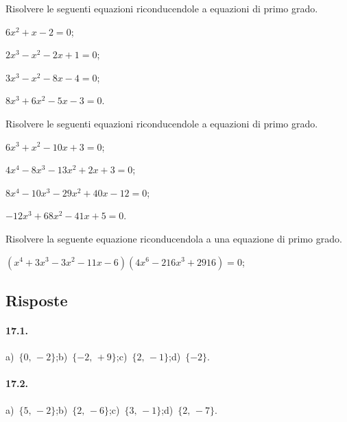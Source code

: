 \begin{esercizio}[\Ast]
\label{ese:17.12}
Risolvere le seguenti equazioni riconducendole a equazioni di primo grado.
\begin{multicols}{2}
\begin{enumeratea}
 \item $6x^{2}+x-2=0$;
 \item $2x^{3}-x^{2}-2x+1=0$;
 \item $3x^{3}-x^{2}-8x-4=0$;
 \item $8x^{3}+6x^{2}-5x-3=0$.
\end{enumeratea}
\end{multicols}
\end{esercizio}

\begin{esercizio}[\Ast]
\label{ese:17.13}
Risolvere le seguenti equazioni riconducendole a equazioni di primo grado.
\begin{multicols}{2}
\begin{enumeratea}
 \item $6x^{3}+x^{2}-10x+3=0$;
 \item $4x^{4}-8x^{3}-13x^{2}+2x+3=0$;
 \item $8x^{4}-10x^{3}-29x^{2}+40x-12=0$;
 \item $-12x^{3}+68x^{2}-41x+5=0$.
\end{enumeratea}
\end{multicols}
\end{esercizio}

\begin{esercizio}[\Ast]
\label{ese:17.14}
Risolvere la seguente equazione riconducendola a una equazione di primo grado.

$(x^{4}+3x^{3}-3x^{2}-11x-6)(4x^{6}-216x^{3}+2916)=0$;
\end{esercizio}

\subsection{Risposte}
 \paragraph{17.1.}
a)~$\{0\text{,~}-2\}$;\quad b)~$\{-2\text{,~}+9\}$;\quad c)~$\{2\text{,~}-1\}$;\quad d)~$\{-2\}$.
\paragraph{17.2.}
a)~$\{5\text{,~}-2\}$;\quad b)~$\{2\text{,~}-6\}$;\quad c)~$\{3\text{,~}-1\}$;\quad d)~$\{2\text{,~}-7\}$.
